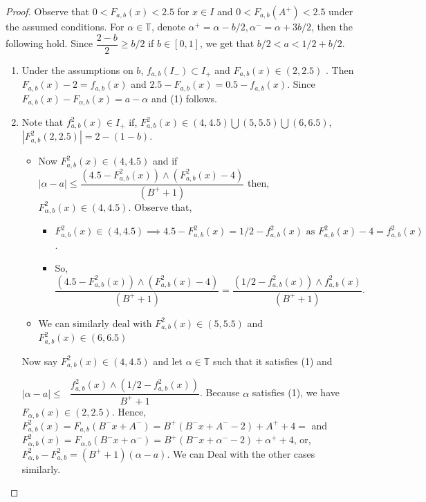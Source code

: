 \documentclass[12pt]{amsart}
\numberwithin{equation}{section}
\theoremstyle{remark}
\begin{document}
\begin{proof}
Observe that $0<F_{a,b}(x)<2.5$ for $x\in I$ and $0<F_{a,b}(A^+)< 2.5$ under the assumed conditions. For $\alpha \in \mathbb{T}$, denote $\alpha^+=\alpha-b/2, \alpha^-=\alpha+3b/2$, then the following hold. Since $\dfrac{2-b}{2}\geq b/2$ if $b \in [0,1] $, we get that $b/2<a<1/2+b/2$. 
 
 \vspace{.3cm}
 
\begin{enumerate}
    \item Under the assumptions on $b$, $f_{a,b}(I_-) \subset I_+$ and  $F_{a,b}(x) \in (2,2.5)$ . Then  $F_{a,b}(x)-2=f_{a,b}(x)$ and $2.5-F_{a,b}(x)=0.5-f_{a,b}(x)$.
    Since $F_{a,b}(x)-F_{\alpha,b}(x)=a-\alpha$ and (1) follows.
    
    \vspace{.3cm}
    \item Note that $f^2_{a,b}(x) \in I_+$ if,  $F^2_{a,b}(x)  \in (4,4.5 ) \bigcup (5,5.5)\bigcup (6,6.5)$, $|F_{a,b}^2(2,2.5)|= 2-(1-b)$.
    \vspace{.1cm}
\begin{itemize}
    \item Now $F^2_{a,b}(x)  \in (4,4.5 )$ and if  $|\alpha-a|\leq \dfrac{(4.5 -F^2_{a,b}(x) ) \wedge (F^2_{a,b}(x)-4)  }{(B^++1)}$ then,\\ $F^2_{\alpha,b}(x) \in (4,4.5) $. Observe that,
    \vspace{.3cm}
    \begin{itemize}
        \item[]  $F^2_{a,b}(x)  \in (4,4.5 ) \implies 4.5 -F^2_{a,b}(x) = 1/2-f_{a,b}^2(x) \text{ as } F^2_{a,b}(x)-4 = f^2_{a,b}(x) $.
        \vspace{.3cm}
        \item[] So, $\dfrac{(4.5 -F^2_{a,b}(x))  \wedge( F^2_{a,b}(x)-4)  }{(B^++1)}=\dfrac{(1/2 -f^2_{a,b}(x))  \wedge f^2_{a,b}(x) }{(B^++1)}.$ 
    \end{itemize}
   \vspace{.3cm}
    \item  We can similarly deal with $F^2_{a,b}(x)  \in (5,5.5 ) $ and $F^2_{a,b}(x)  \in (6,6.5 ) $
    
\end{itemize}
    Now say $F_{a,b}^2(x) \in (4,4.5)$ and let $\alpha \in \mathbb{T} $ such that it satisfies (1) and
    \vspace{.3cm}
    
    $|\alpha-a| \leq \text{ } \dfrac{f^2_{a,b}(x) \wedge (1/2-f^2_{a,b}(x))}{B^++1}$. Because $\alpha$ satisfies (1), we have $F_{\alpha,b}(x) \in (2,2.5)$. Hence, 
    $F^2_{a,b}(x)=F_{a,b}(B^-x+A^-)=B^+(B^-x+A^--2) +A^++4=$ and $F^2_{\alpha,b}(x)=F_{\alpha,b}(B^-x+\alpha^-)=B^+(B^-x+\alpha^--2) +\alpha^++4$, or, $F^2_{\alpha,b}-F^2_{a,b}= (B^++1)(\alpha-a)$. We can Deal with the other cases similarly.
    

\end{enumerate}
\end{proof}
\end{document}
